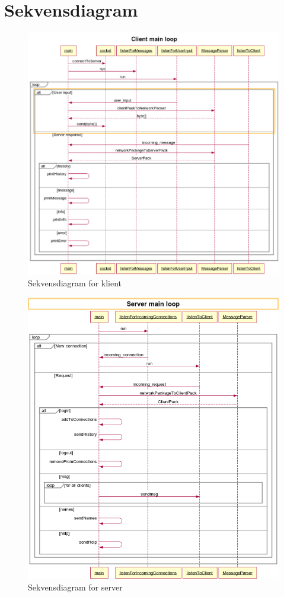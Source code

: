 \documentclass[12pt,a4paper,norsk]{article}
\begin{document}
\section{Sekvensdiagram}
\begin{figure}[ht!]
    \centering
    \includegraphics[width=\textwidth]{sequence_client_main.png}
    \caption{Sekvensdiagram for klient}
    \label{seq_client}
\end{figure}

\begin{figure}[ht!]
    \centering
    \includegraphics[width=\textwidth]{sequence_server_main.png}
    \caption{Sekvensdiagram for server}
    \label{seq_server}
\end{figure}
\end{document}
